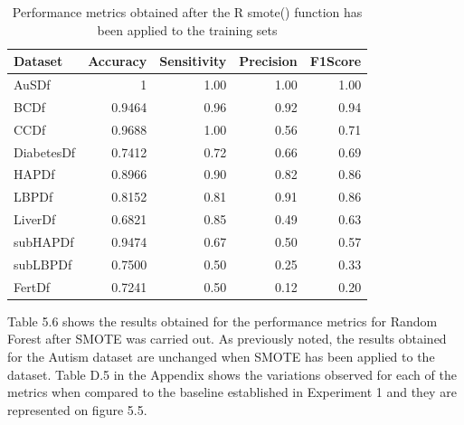 \begin{table}[!htbp]
\centering
\begin{tabular}{lrrrr}
  \hline
  \rowcolor{LightCyan}
Dataset & Accuracy & Sensitivity & Precision & F1Score \\ 
  \hline
AuSDf & 1 & 1.00 & 1.00 & 1.00 \\ 
  BCDf & 0.9464 & 0.96 & 0.92 & 0.94 \\ 
  CCDf & 0.9688 & 1.00 & 0.56 & 0.71 \\ 
  DiabetesDf & 0.7412 & 0.72 & 0.66 & 0.69 \\ 
  HAPDf & 0.8966 & 0.90 & 0.82 & 0.86 \\ 
  LBPDf & 0.8152 & 0.81 & 0.91 & 0.86 \\ 
  LiverDf & 0.6821 & 0.85 & 0.49 & 0.63 \\ 
  subHAPDf & 0.9474 & 0.67 & 0.50 & 0.57 \\ 
  subLBPDf & 0.7500 & 0.50 & 0.25 & 0.33 \\ 
  FertDf & 0.7241 & 0.50 & 0.12 & 0.20 \\ 
   \hline
\end{tabular}
\caption{Performance metrics obtained after the R smote() function has been applied to the training sets}
\label{tab:SMOTEVar}
\end{table}

Table 5.6 shows the results obtained for the performance metrics for Random Forest after SMOTE was carried out.\newline
As previously noted, the results obtained for the Autism dataset are unchanged when SMOTE has been applied to the dataset.\newline
Table D.5 in the Appendix shows the variations observed for each of the metrics when compared to the baseline established in Experiment 1 and they are represented on figure 5.5.\newline

